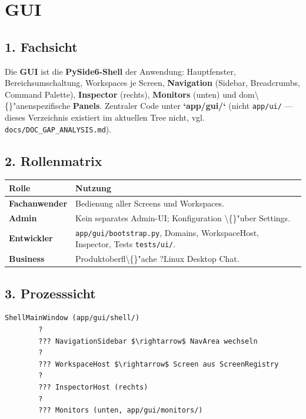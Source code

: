 \section{GUI}

\subsection{1. Fachsicht}

Die \textbf{GUI} ist die \textbf{PySide6-Shell} der Anwendung: Hauptfenster, Bereichsumschaltung, Workspaces je Screen, \textbf{Navigation} (Sidebar, Breadcrumbs, Command Palette), \textbf{Inspector} (rechts), \textbf{Monitors} (unten) und dom\textbackslash\{\}"anenspezifische \textbf{Panels}. Zentraler Code unter \textbf{`app/gui/`} (nicht \texttt{app/ui/} --- dieses Verzeichnis existiert im aktuellen Tree nicht, vgl. \texttt{docs/DOC\_GAP\_ANALYSIS.md}).

\subsection{2. Rollenmatrix}

\begin{center}
\begin{tabular}{ll}
\hline
Rolle & Nutzung \\
\hline
\textbf{Fachanwender} & Bedienung aller Screens und Workspaces. \\
\textbf{Admin} & Kein separates Admin-UI; Konfiguration \textbackslash\{\}"uber Settings. \\
\textbf{Entwickler} & \texttt{app/gui/bootstrap.py}, Domains, WorkspaceHost, Inspector, Tests \texttt{tests/ui/}. \\
\textbf{Business} & Produktoberfl\textbackslash\{\}"ache ?Linux Desktop Chat\texttt{}. \\
\hline
\end{tabular}
\end{center}

\subsection{3. Prozesssicht}

\begin{verbatim}
ShellMainWindow (app/gui/shell/)
        ?
        ??? NavigationSidebar $\rightarrow$ NavArea wechseln
        ?
        ??? WorkspaceHost $\rightarrow$ Screen aus ScreenRegistry
        ?
        ??? InspectorHost (rechts)
        ?
        ??? Monitors (unten, app/gui/monitors/)
\end{verbatim}

